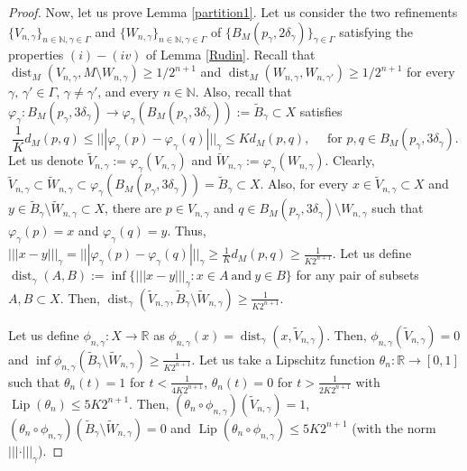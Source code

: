\documentclass[11pt]{amsart}
\numberwithin{equation}{section}
\begin{document}
\begin{proof}
Now, let us prove Lemma \ref{partition1}.
Let us consider the two refinements $\{V_{n,\gamma}\}_{n\in\mathbb{N},\gamma\in\Gamma}$ and $\{W_{n,\gamma}\}_{n\in\mathbb{N},\gamma\in\Gamma}$ of $\{B_M(p_\gamma,2\delta_\gamma)\}_{\gamma\in\Gamma}$ satisfying the properties $(i)-(iv)$ of Lemma \ref{Rudin}. Recall that ${\operatorname{dist}}_M(V_{n,\gamma},M\setminus W_{n,\gamma})\ge {1}/{2^{n+1}}$ and
${\operatorname{dist}}_M(W_{n,\gamma},W_{n,\gamma'})\geq 1/2^{n+1}$ for  every $\gamma,\,\gamma'\in\Gamma$, $\gamma\not=\gamma'$, and  every $n\in\mathbb{N}$. Also, recall that $\varphi_{\gamma}:B_M(p_\gamma,3\delta_\gamma)\to \varphi_\gamma(B_M({p_\gamma},3\delta_\gamma)) := \widetilde{B}_\gamma \subset X$ satisfies
\begin{equation*}
\frac{1}{K} d_M(p,q)\le |||\varphi_{\gamma}(p)-\varphi_{\gamma}(q)|||_\gamma\le K d_M(p,q), \quad \text{ for } p,q\in B_M(p_\gamma,3\delta_\gamma).
\end{equation*}
Let us denote $\widetilde{V}_{n,\gamma}:=\varphi_{\gamma}(V_{n,\gamma})$ and $\widetilde{W}_{n,\gamma}:=\varphi_{\gamma}(W_{n,\gamma})$. Clearly,  $\widetilde{V}_{n,\gamma}\subset \widetilde{W}_{n,\gamma}\subset \varphi_\gamma(B_M({p_\gamma},3\delta_\gamma))=\widetilde{B}_\gamma  \subset X$. Also, for every $x\in  \widetilde{V}_{n,\gamma}\subset X$ and $y\in \widetilde{B}_\gamma \setminus  \widetilde{W}_{n,\gamma}\subset X$, there are $p\in V_{n,\gamma}$ and $q\in B_M(p_\gamma,3\delta_\gamma)\setminus W_{n,\gamma}$ such that $\varphi_{\gamma}(p)=x$ and $\varphi_{\gamma}(q)=y$. Thus, $|||x-y|||_\gamma=|||\varphi_{\gamma}(p)-\varphi_{\gamma}(q)|||_\gamma  \ge \frac{1}{K}  d_M(p,q)\ge \frac{1}{K2^{n+1}}$.
Let us define ${\operatorname{dist}}_\gamma(A,B):=\inf\{|||x-y|||_\gamma: x\in A \ \text{and}\ y\in B\}$ for any pair of subsets $A,B\subset X$.
Then,   ${\operatorname{dist}}_\gamma(\widetilde{V}_{n,\gamma},\widetilde{B}_\gamma \setminus \widetilde{W}_{n,\gamma})\ge \frac{1}{K2^{n+1}}$.

Let us define $\phi_{n,\gamma}:X\to {\mathbb{R}}$ as $\phi_{n,\gamma}(x)={\operatorname{dist}}_\gamma (x, \widetilde{V}_{n,\gamma})$. Then,
 $\phi_{n,\gamma}(\widetilde{V}_{n,\gamma})=0$ and $\inf \phi_{n,\gamma}(\widetilde{B}_\gamma \setminus  \widetilde{W}_{n,\gamma})\ge \frac{1}{K 2^{n+1}}$. Let us take a  Lipschitz function $\theta_n:{\mathbb{R}}\to [0,1]$ such that
$\theta_n(t)=1$ for $t<\frac{1}{4 K2^{n+1}}$, $\theta_n(t)=0$  for
$t>\frac{1}{2K2^{n+1}}$
with ${\operatorname{Lip}}(\theta_n)\le 5K2^{n+1}$.
Then, $(\theta_n\circ \phi_{n,\gamma})(\widetilde{V}_{n,\gamma})=1$,  $(\theta_n\circ \phi_{n,\gamma})(\widetilde{B}_\gamma \setminus \widetilde{W}_{n,\gamma})=0$ and ${\operatorname{Lip}}(\theta_n\circ\phi_{n,\gamma})\le 5 K2^{n+1}$ (with the norm $|||\cdot|||_\gamma$).


\end{proof}
\end{document}
